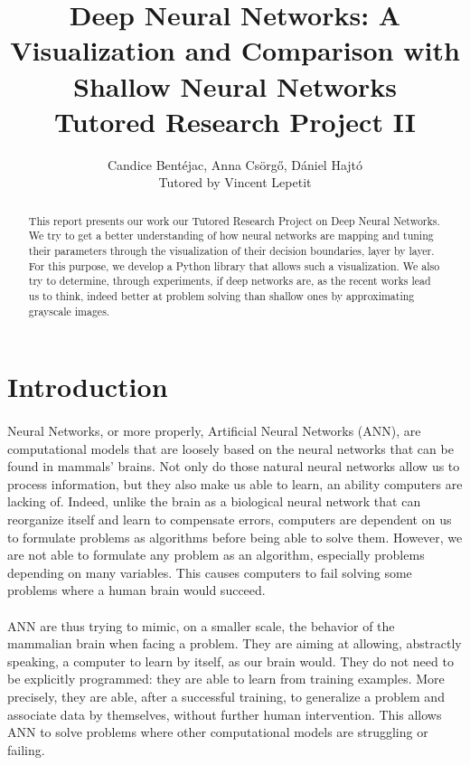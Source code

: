 \documentclass[a4paper]{article}
\title{Deep Neural Networks: A Visualization and Comparison with Shallow Neural Networks\\ \large Tutored Research Project II}
\author{Candice Bent\'ejac, Anna Cs\"org\H o, D\'aniel Hajt\'o \\Tutored by Vincent Lepetit}
\begin{document}
\maketitle

\begin{abstract}
This report presents our work our Tutored Research Project on Deep Neural Networks. We try to get a better understanding of how neural networks are mapping and tuning their parameters through the visualization of their decision boundaries, layer by layer. For this purpose, we develop a Python library that allows such a visualization. We also try to determine, through experiments, if deep networks are, as the recent works lead us to think, indeed better at problem solving than shallow ones by approximating grayscale images. 
\end{abstract}

\section{Introduction}

\paragraph{}Neural Networks, or more properly, Artificial Neural Networks (ANN), are computational models that are loosely based on the neural networks that can be found in mammals' brains. Not only do those natural neural networks allow us to process information, but they also make us able to learn, an ability computers are lacking of. Indeed, unlike the brain as a biological neural network that can reorganize itself and learn to compensate errors, computers are dependent on us to formulate problems as algorithms before being able to solve them. However, we are not able to  formulate any problem as an algorithm, especially problems depending on many variables. This causes computers to fail solving some problems where a human brain would succeed. \citep{Krose1996}

\paragraph{}ANN are thus trying to mimic, on a smaller scale, the behavior of the mammalian brain when facing a problem. They are aiming at allowing, abstractly speaking, a computer to learn by itself, as our brain would. They do not need to be explicitly programmed: they are able to learn from training examples. More precisely, they are able, after a successful training, to generalize a problem and associate data by themselves, without further human intervention. This allows ANN to solve problems where other computational models are struggling or failing.
\end{document}
